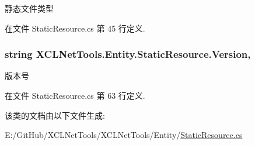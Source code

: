 静态文件类型 



在文件 Static\+Resource.\+cs 第 45 行定义.

\subsubsection[{\texorpdfstring{Version}{Version}}]{\setlength{\rightskip}{0pt plus 5cm}string X\+C\+L\+Net\+Tools.\+Entity.\+Static\+Resource.\+Version\hspace{0.3cm}{\ttfamily [get]}, {\ttfamily [set]}}\hypertarget{class_x_c_l_net_tools_1_1_entity_1_1_static_resource_a4b85a7d2f6dc6169a10ebfe2987f2404}{}\label{class_x_c_l_net_tools_1_1_entity_1_1_static_resource_a4b85a7d2f6dc6169a10ebfe2987f2404}


版本号 



在文件 Static\+Resource.\+cs 第 63 行定义.



该类的文档由以下文件生成\+:\begin{DoxyCompactItemize}
\item 
E\+:/\+Git\+Hub/\+X\+C\+L\+Net\+Tools/\+X\+C\+L\+Net\+Tools/\+Entity/\hyperlink{_static_resource_8cs}{Static\+Resource.\+cs}\end{DoxyCompactItemize}
